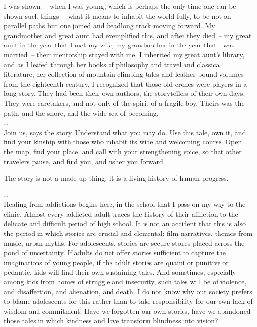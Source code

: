 \documentclass[10pt,DIV09,letterpaper,oneside,headsepline]{scrreprt}
\begin{document}
I was shown~-- when I was young, which is perhaps the only time one can be shown such things~-- what it means to inhabit the world fully, to be not on parallel paths but one joined and headlong track moving forward. My grandmother and great aunt had exemplified this, and after they died~-- my great aunt in the year that I met my wife, my grandmother in the year that I was married~-- their mentorship stayed with me. I inherited my great aunt's library, and as I leafed through her books of philosophy and travel and classical literature, her collection of mountain climbing tales and leather-bound volumes from the eighteenth century, I recognized that those old crones were players in a long story. They had been their own authors, the storytellers of their own days. They were caretakers, and not only of the spirit of a fragile boy. Theirs was the path, and the shore, and the wide sea of becoming.
\\
\ldots
\\
Join us, says the story. Understand what you may do. Use this tale, own it, and find your kinship with those who inhabit its wide and welcoming course. Open the map, find your place, and call with your strengthening voice, so that other travelers pause, and find you, and usher you forward.

The story is not a made up thing. It is a living history of human progress.

\ldots
\\
Healing from addictions begins here, in the school that I pass on my way to the clinic. Almost every addicted adult traces the history of their affliction to the delicate and difficult period of high school. It is not an accident that this is also the period in which stories are crucial and elemental: film narratives, themes from music, urban myths. For adolescents, stories are secure stones placed across the pond of uncertainty. If adults do not offer stories sufficient to capture the imaginations of young people, if the adult stories are quaint or punitive or pedantic, kids will find their own sustaining tales. And sometimes, especially among kids from homes of struggle and insecurity, such tales will be of violence, and disaffection, and alienation, and death. I do not know why our society prefers to blame adolescents for this rather than to take responsibility for our own lack of wisdom and commitment. Have we forgotten our own stories, have we abandoned those tales in which kindness and love transform blindness into vision?
\end{document}
